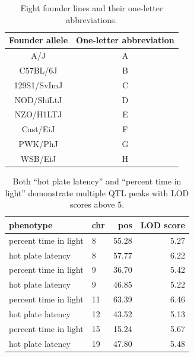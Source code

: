 \documentclass[12pt,twoside, lineno]{gsajnl}
\begin{document}


\newpage
\appendix

\renewcommand{\thetable}{\textbf{S\arabic{table}}}
\setcounter{table}{0}


\begin{table}
  \caption{Eight founder lines and their one-letter abbreviations.}
  \label{table-letters}
\begin{center}
\small
  \begin{tabular}{ c | c }
    \hline
    Founder allele & One-letter abbreviation \\ \hline
    A/J & A \\
    C57BL/6J & B \\
    129S1/SvImJ & C \\
    NOD/ShiLtJ & D\\
    NZO/H1LTJ & E\\
    Cast/EiJ & F\\
    PWK/PhJ & G\\
    WSB/EiJ & H\\
    \hline
  \end{tabular}

\end{center}
  \end{table}

\clearpage

\begin{table}
\caption{Both ``hot plate latency'' and ``percent time in light''
  demonstrate multiple QTL peaks with LOD scores above 5.}
  \label{table-peaks}
\begin{center}
\begin{tabular}{l|lrr}
  \hline
phenotype & chr & pos & LOD score \\
   \hline
percent time in light & 8 & 55.28 & 5.27 \\
 hot plate latency & 8 & 57.77 & 6.22 \\
 percent time in light & 9 & 36.70 & 5.42 \\
 hot plate latency & 9 & 46.85 & 5.22 \\
 percent time in light & 11 & 63.39 & 6.46 \\
 hot plate latency & 12 & 43.52 & 5.13 \\
 percent time in light & 15 & 15.24 & 5.67 \\
 hot plate latency & 19 & 47.80 & 5.48 \\
   \hline
\end{tabular}
\end{center}
\end{table}
\end{document}
